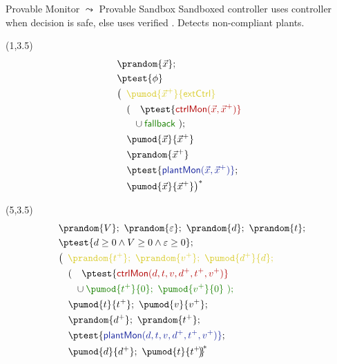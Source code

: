 \documentclass[slidestop,aspectratio=169]{beamer}
\newcommand{\fallback}{\textsf{\upshape fallback}\xspace}
\newcommand{\ctrlMon}{\textsf{\upshape ctrlMon}\xspace}
\newcommand{\plantMon}{\textsf{\upshape plantMon}\xspace}
\newcommand{\goback}{\!\!\!\!}
\theoremstyle{plain}
\theoremstyle{definition}
\theoremstyle{remark}
\begin{document}
\begin{frame}[t]{Provable Monitor $\leadsto$ Provable Sandbox}
Sandboxed controller uses {\color{myyellow}{external}}  controller when decision is {\color{vred}safe}, else uses verified {\color{vgreen}{fallback}}.
Detects non-compliant {\color{vblue}plants}.
\begin{textblock}{8}(1,3.5)
\small\begin{align*}
&\prandom{\vec{x}};\\
&\ptest{\phi}\\
& \bigl(\hspace{.5em} \color{myyellow}{\pumod{\vec{x}^+}{\textsf{extCtrl}}}\\
& \quad (~\phantom{\cup} \ptest{\color{vred}{\ctrlMon(\vec{x},\vec{x}^+)}}\\
& \quad \phantom{(~}\cup {\color{vgreen}{\fallback}} ~); \goback{}\\
& \quad \pumod{\vec{x}}{\vec{x}^+}\\
& \quad \prandom{\vec{x}^+} \\
& \quad  \ptest{\color{vblue}{\plantMon(\vec{x},\vec{x}^+)}};\\
& \quad  \pumod{\vec{x}}{\vec{x}^+}\bigr)^* 
  \end{align*}
\end{textblock}
\begin{textblock}{10}(5,3.5)
\small\begin{align*}
& \prandom{V};~\prandom{\varepsilon};~ \prandom{d};~\prandom{t}; \goback{}\\
& \ptest{d \geq 0 \land V\geq 0 \land \varepsilon \geq 0};  \goback{}\\
& \bigl(\hspace{.5em} \color{myyellow}{\prandom{t^+};~\prandom{v^+};~ \pumod{d^+}{d};}  \goback{}\\
& \quad (~\phantom{\cup} \ptest{\color{vred}{\ctrlMon(d,t,v,d^+,t^+,v^+)}}\\
& \quad \phantom{(~}\cup \color{vgreen}{\pumod{t^+}{0};~\pumod{v^+}{0}} ~); \goback{}\\
& \quad \pumod{t}{t^+};~\pumod{v}{v^+};  \goback{}\\
& \quad  \prandom{d^+};~\prandom{t^+};  \goback{}\\
& \quad  \ptest{\color{vblue}{\plantMon(d,t,v,d^+,t^+,v^+)}};\\
& \quad  \pumod{d}{d^+};~\pumod{t}{t^+}  \goback{}\bigr)^* 
\end{align*}
\end{textblock}
\end{frame}
\end{document}
